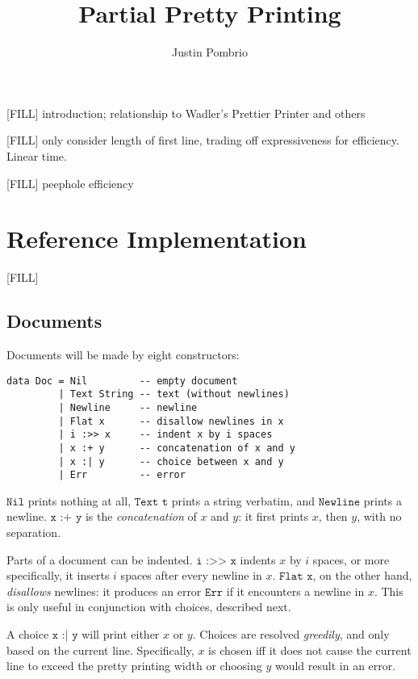 \documentclass{article}
\newcommand{\ind}[2]{\texttt{#1 :>> #2}}
\newcommand{\cat}[2]{\texttt{#1 :+ #2}}
\newcommand{\choice}[2]{\texttt{#1 :| #2}}
\newcommand{\txt}[1]{\texttt{Text #1}}
\newcommand{\nil}{\texttt{Nil}}
\newcommand{\err}{\texttt{Err}}
\newcommand{\nl}{\texttt{Newline}}
\renewcommand{\flat}[1]{\texttt{Flat #1}}
\begin{document}
\author{Justin Pombrio}
\title{Partial Pretty Printing}
\maketitle

[FILL] introduction; relationship to Wadler's Prettier Printer and others

[FILL] only consider length of first line, trading off expressiveness for efficiency. Linear time.

[FILL] peephole efficiency

\section{Reference Implementation}

[FILL]

\subsection{Documents}

Documents will be made by eight constructors:

\begin{lstlisting}
data Doc = Nil         -- empty document
         | Text String -- text (without newlines)
         | Newline     -- newline
         | Flat x      -- disallow newlines in x
         | i :>> x     -- indent x by i spaces
         | x :+ y      -- concatenation of x and y
         | x :| y      -- choice between x and y
         | Err         -- error
\end{lstlisting}

$\nil$ prints nothing at all, $\txt{t}$ prints a string verbatim, and $\nl$ prints a newline.
$\cat{x}{y}$ is the \emph{concatenation} of $x$ and $y$: it first prints $x$, then $y$, with no
separation.

Parts of a document can be indented. $\ind{i}{x}$ indents $x$ by $i$ spaces, or more specifically, it
inserts $i$ spaces after every newline in $x$. $\flat{x}$, on the other hand, \emph{disallows}
newlines: it produces an error $\err$ if it encounters a newline in $x$. This is only useful in
conjunction with choices, described next.

A choice $\choice{x}{y}$ will print either $x$ or $y$. Choices are resolved \emph{greedily}, and
only based on the current line. Specifically, $x$ is chosen iff it does not cause the current line
to exceed the pretty printing width or choosing $y$ would result in an error.
\end{document}
